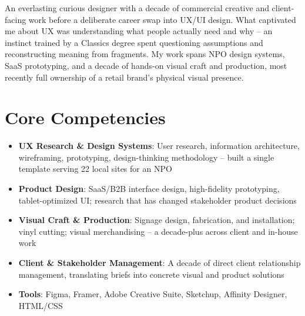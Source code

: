 \documentclass[11pt,a4paper,sans]{moderncv}
\begin{document}
\makecvtitle


\vspace{6pt}
\small{An everlasting curious designer with a decade of commercial creative and client-facing work before a deliberate career swap into UX/UI design. What captivated me about UX was understanding what people actually need and why -- an instinct trained by a Classics degree spent questioning assumptions and reconstructing meaning from fragments. My work spans NPO design systems, SaaS prototyping, and a decade of hands-on visual craft and production, most recently full ownership of a retail brand's physical visual presence.}


\section{Core Competencies}
\vspace{1pt}
\begin{itemize}

\item \textbf{UX Research \& Design Systems}: User research, information architecture, wireframing, prototyping, design-thinking methodology -- built a single template serving 22 local sites for an NPO

\item \textbf{Product Design}: SaaS/B2B interface design, high-fidelity prototyping, tablet-optimized UI; research that has changed stakeholder product decisions

\item \textbf{Visual Craft \& Production}: Signage design, fabrication, and installation; vinyl cutting; visual merchandising -- a decade-plus across client and in-house work

\item \textbf{Client \& Stakeholder Management}: A decade of direct client relationship management, translating briefs into concrete visual and product solutions

\item \textbf{Tools}: Figma, Framer, Adobe Creative Suite, Sketchup, Affinity Designer, HTML/CSS

\end{itemize}
\end{document}
